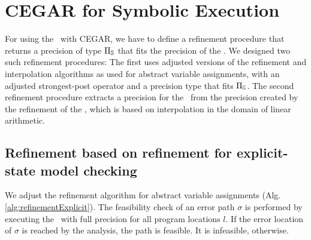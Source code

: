 \section{CEGAR for Symbolic Execution}
For using the \symbolicExecutionCPA\ with CEGAR, we have to define a refinement procedure that returns a precision of type $\Pi_{\mathbb{S}}$ that fits the precision of the \symbolicExecutionCPA. We designed two such refinement procedures:
The first uses adjusted versions of the refinement and interpolation algorithms as used for abstract variable assignments,
with an adjusted strongest-post operator and a precision type that fits $\Pi_{\mathbb{S}}$.
The second refinement procedure extracts a precision for the \symbolicExecutionCPA\ from the precision created by the refinement of the \predicateCPA, which is based on interpolation in the domain of linear arithmetic.

\subsection{Refinement based on refinement for explicit-state model checking}
\label{sec:assignmentRefinement}
We adjust the refinement algorithm for abstract variable assignments (Alg. \ref{alg:refinementExplicit}).
The feasibility check of an error path $\sigma$ is performed by executing the \symbolicExecutionCPA\ with full precision for all program locations $l$.
If the error location of $\sigma$ is reached by the analysis, the path is feasible. It is infeasible, otherwise.

